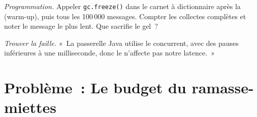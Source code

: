 \begin{exercise}[$\star\star\star$]\label{exo:ll:managed-and-functional-languages-on-the-desk:7}
\emph{Programmation.} Appeler \texttt{gc.freeze()} dans le carnet à dictionnaire après la  (warm-up), puis tous les 100\,000 messages. Compter les
collectes complètes et noter le message le plus lent. Que sacrifie le gel~?
\end{exercise}

\begin{exercise}[$\star\star\star$]\label{exo:ll:managed-and-functional-languages-on-the-desk:8}
\emph{Trouver la faille.} «~La passerelle Java utilise le  concurrent, avec des pauses inférieures à une milliseconde, donc le 
n'affecte pas notre latence.~»
\end{exercise}

\section{Problème~: Le budget du ramasse-miettes}

